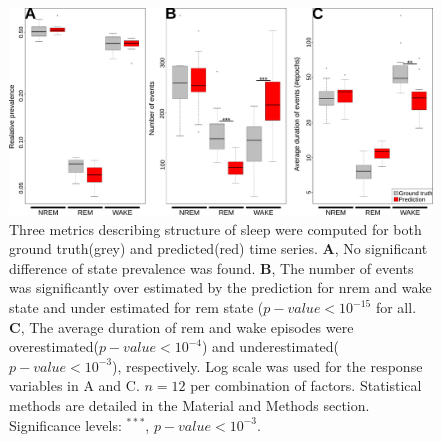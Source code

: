 \begin{figure}[h!]
  \centering    
    \includegraphics[width=1.0\textwidth]{figures/struct_assess.pdf}
  \caption{
  Three metrics describing structure of sleep were computed for both ground truth(grey) and predicted(red) time series.
  \textbf{A}, No significant difference of state prevalence was found.
  \textbf{B}, The number of events was significantly over estimated by the prediction for \gls{nrem} and wake state and under estimated for \gls{rem} state ($p-value < 10^{-15}$ for all.
  \textbf{C}, The average duration of \gls{rem} and wake episodes were overestimated($p-value < 10^{-4}$) and underestimated($p-value < 10^{-3}$), respectively.
  Log scale was used for the response variables in A and C.  $n = 12$ per combination of factors. 
  Statistical methods are detailed in the Material and Methods section.
  Significance levels: $^{***}$, $p-value < 10^{-3}$.
  \label{fig:struct_assess}
  }
\end{figure}
